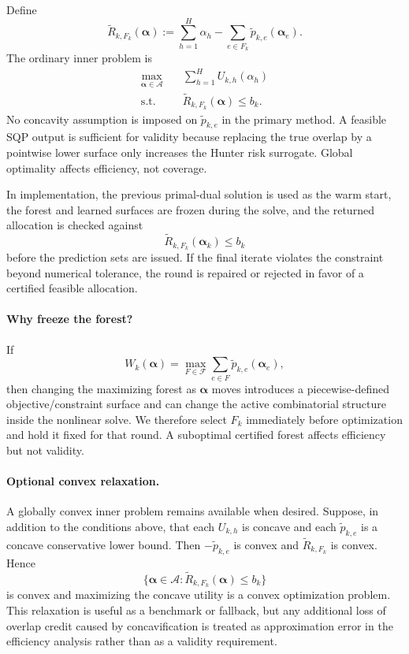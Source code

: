 \documentclass[11pt]{article}
\newcommand{\calA}{\mathcal{A}}
\begin{document}
Define
\begin{equation}
    \widetilde R_{k,F_k}(\bm\alpha)
    :=
    \sum_{h=1}^H\alpha_h
    -
    \sum_{e\in F_k}\widetilde p_{k,e}(\bm\alpha_e).
    \label{eq:sqp-risk-surface}
\end{equation}
The ordinary inner problem is
\begin{equation}
\boxed{
\begin{aligned}
    \max_{\bm\alpha\in\calA}\quad
        & \sum_{h=1}^H U_{k,h}(\alpha_h)\\
    \text{s.t.}\quad
        & \widetilde R_{k,F_k}(\bm\alpha)\le b_k.
\end{aligned}}
\label{eq:sqp-inner-problem}
\end{equation}
No concavity assumption is imposed on $\widetilde p_{k,e}$ in the primary
method.  A feasible SQP output is sufficient for validity because replacing the
true overlap by a pointwise lower surface only increases the Hunter risk
surrogate.  Global optimality affects efficiency, not coverage.

In implementation, the previous primal-dual solution is used as the warm start,
the forest and learned surfaces are frozen during the solve, and the returned
allocation is checked against
\[
    \widetilde R_{k,F_k}(\bm\alpha_k)\le b_k
\]
before the prediction sets are issued.  If the final iterate violates the
constraint beyond numerical tolerance, the round is repaired or rejected in
favor of a certified feasible allocation.

\paragraph{Why freeze the forest?}
If
\[
    W_k(\bm\alpha)
    =
    \max_{F\in\mathcal F}
    \sum_{e\in F}\widetilde p_{k,e}(\bm\alpha_e),
\]
then changing the maximizing forest as $\bm\alpha$ moves introduces a
piecewise-defined objective/constraint surface and can change the active
combinatorial structure inside the nonlinear solve.  We therefore select
$F_k$ immediately before optimization and hold it fixed for that round.  A
suboptimal certified forest affects efficiency but not validity.

\paragraph{Optional convex relaxation.}
A globally convex inner problem remains available when desired.  Suppose, in
addition to the conditions above, that each $U_{k,h}$ is concave and each
$\widetilde p_{k,e}$ is a concave conservative lower bound.  Then
$-\widetilde p_{k,e}$ is convex and
$\widetilde R_{k,F_k}$ is convex.  Hence
\[
    \{\bm\alpha\in\calA:\widetilde R_{k,F_k}(\bm\alpha)\le b_k\}
\]
is convex and maximizing the concave utility is a convex optimization problem.
This relaxation is useful as a benchmark or fallback, but any additional loss
of overlap credit caused by concavification is treated as approximation error
in the efficiency analysis rather than as a validity requirement.
\end{document}
